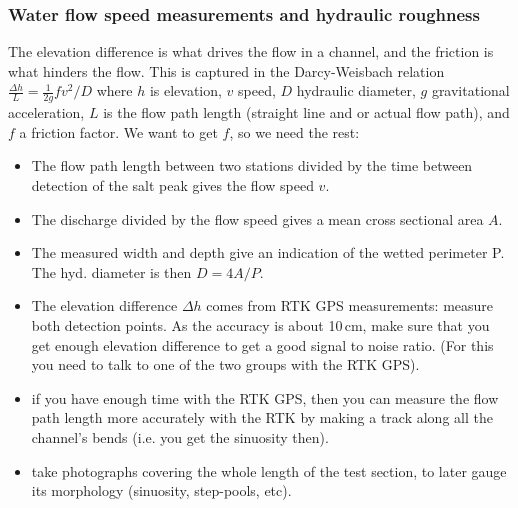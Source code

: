 \documentclass[DIV=15,halfparskip,11pt,headinclude]{scrartcl}
\begin{document}

\subsubsection{Water flow speed measurements and hydraulic roughness}

The elevation difference is what drives the flow in a channel, and the
friction is what hinders the flow.  This is captured in the
Darcy-Weisbach relation $\frac{\Delta h}{L} = \frac{1}{2g} f v^2/D$ where $h$ is
elevation, $v$ speed, $D$ hydraulic diameter, $g$ gravitational
acceleration, $L$ is the flow path length (straight line and or actual flow path),
and $f$ a friction factor.  We want to get $f$, so we
need the rest:

\begin{itemize}
\item The flow path length between two stations divided
by the time between detection of the salt peak gives the flow speed $v$.
\item The discharge divided by the flow speed gives a mean cross sectional
  area $A$.
\item The measured width and depth give an indication of the wetted
perimeter P.  The hyd. diameter is then $D = 4A/P$.
\item The elevation difference $\Delta h$ comes from RTK GPS measurements: measure both
detection points.  As the accuracy is about 10\,cm,
make sure that you get enough elevation difference to get a good
signal to noise ratio.  (For this you need to talk to one of the two
groups with the RTK GPS).
\item if you have enough time with the RTK GPS, then you can measure the
  flow path length more accurately with the RTK by making a track
  along all the channel's bends (i.e. you get the sinuosity then).
\item take photographs covering the whole length of the test section,
  to later gauge its morphology (sinuosity, step-pools, etc).
\end{itemize}


\end{document}
